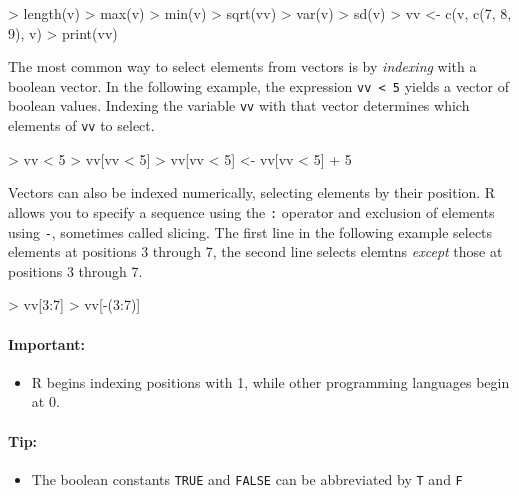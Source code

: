 \begin{samepage}
\begin{Rcode}
> length(v)
> max(v)
> min(v)
> sqrt(vv)
> var(v)
> sd(v)
> vv <- c(v, c(7, 8, 9), v)
> print(vv)
\end{Rcode}
\end{samepage}

The most common way to select elements from vectors is by \emph{indexing} with a boolean vector. In the following example, the expression \texttt{vv < 5} yields a vector of boolean values. Indexing the variable \texttt{vv} with that vector determines which elements of \texttt{vv} to select.

\begin{samepage}
\begin{Rcode}
> vv < 5
> vv[vv < 5]
> vv[vv < 5] <- vv[vv < 5] + 5
\end{Rcode}
\end{samepage}

Vectors can also be indexed numerically, selecting elements by their position. R allows you to specify a sequence using the \texttt{:} operator and exclusion of elements using \texttt{-}, sometimes called slicing. The first line in the following example selects elements at positions 3 through 7, the second line selects elemtns \emph{except} those at positions 3 through 7.

\begin{samepage}
\begin{Rcode}
> vv[3:7]
> vv[-(3:7)]
\end{Rcode}
\end{samepage}

\begin{tcolorbox}[colback=alert]
\paragraph*{Important:}
\begin{itemize}
   \item R begins indexing positions with 1, while other programming languages begin at 0.
\end{itemize}
\end{tcolorbox}

\begin{tcolorbox}[colback=code]
\paragraph*{Tip:}
\begin{itemize}
   \item The boolean constants \texttt{TRUE} and \texttt{FALSE} can be abbreviated by \texttt{T} and \texttt{F}
\end{itemize}
\end{tcolorbox}

